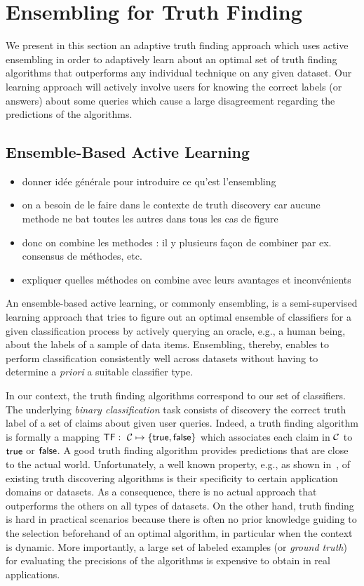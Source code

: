 \section{Ensembling for Truth Finding}\label{ensembling}
We present in this section an adaptive truth finding approach which uses active ensembling in order to 
adaptively learn about an optimal set of truth finding algorithms that outperforms any individual
technique on any given dataset. Our learning approach will actively involve users for knowing the correct
labels (or answers) about some queries which cause a large disagreement regarding the predictions of the algorithms.

\subsection{Ensemble-Based Active Learning}
\begin{itemize}
\item donner idée générale pour introduire  ce qu'est l'ensembling
\item on a besoin de le faire dans le contexte de truth discovery car aucune methode ne bat toutes les autres dans tous les cas de figure
\item donc on combine les methodes : il y plusieurs façon de combiner par ex. consensus de méthodes, etc.
\item expliquer quelles méthodes on combine avec leurs avantages et inconvénients
\end{itemize}

\medskip
An ensemble-based active learning, or commonly ensembling, is a semi-supervised learning approach that tries
to figure out an optimal ensemble of classifiers for a given classification process by actively querying an 
oracle, e.g., a human being, about the labels of a sample of data items. Ensembling, thereby, enables to perform
classification consistently well across datasets without having to determine a \emph{priori} a suitable classifier 
type.

In our context, the truth finding algorithms correspond to our set of classifiers. The underlying \emph{binary classification} 
task consists of discovery the correct truth label of a set of claims about given user queries. Indeed, a truth finding 
algorithm is formally a mapping $\textsf{TF}:~\mathcal{C} \mapsto \{\mathsf{true}, \mathsf{false}\}$ which associates each claim in $\mathcal{C}$
to $\mathsf{true}$ or $\mathsf{false}$. A good truth finding algorithm provides  predictions that are close to the actual world. Unfortunately, 
a well known property, e.g., as shown in~\cite{Li12, Wagui14}, of existing truth discovering algorithms is their specificity to 
certain application domains or datasets. As a consequence, there is no actual approach that outperforms the others on all types 
of datasets. On the other hand, truth finding is hard in practical scenarios because there is often no prior knowledge guiding to
the selection beforehand of an optimal algorithm, in particular when the context is dynamic. More importantly, a large set of labeled 
examples (or \emph{ground truth}) for evaluating the precisions of the algorithms is expensive to obtain in real applications. 

